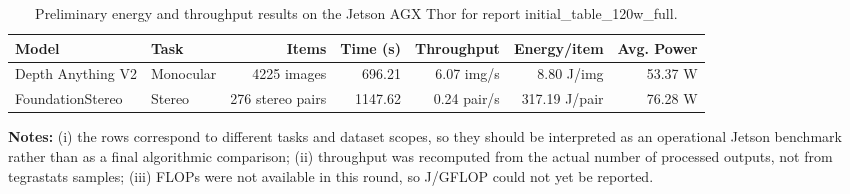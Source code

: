 \begin{table}[t]
\centering
\caption{Preliminary energy and throughput results on the Jetson AGX Thor for report initial_table_120w_full.}
\label{tab:initial_table_120w_full}
\begin{tabular}{l l r r r r r}
\hline
Model & Task & Items & Time (s) & Throughput & Energy/item & Avg. Power \\
\hline
Depth Anything V2 & Monocular & 4225 images & 696.21 & 6.07 img/s & 8.80 J/img & 53.37 W \\
FoundationStereo & Stereo & 276 stereo pairs & 1147.62 & 0.24 pair/s & 317.19 J/pair & 76.28 W \\
\hline
\end{tabular}
\vspace{0.4em}

\parbox{0.96\linewidth}{\footnotesize
\textbf{Notes:}
(i) the rows correspond to different tasks and dataset scopes, so they should be interpreted as an operational Jetson benchmark rather than as a final algorithmic comparison;
(ii) throughput was recomputed from the actual number of processed outputs, not from tegrastats samples;
(iii) FLOPs were not available in this round, so J/GFLOP could not yet be reported.}
\end{table}
